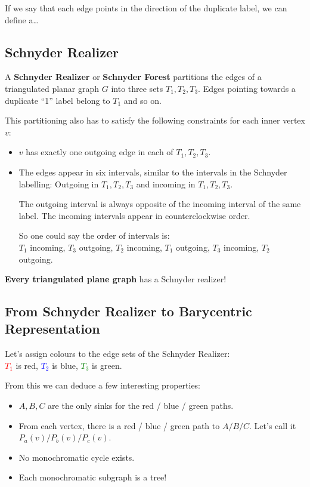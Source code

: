 \documentclass[10pt,a4paper]{article}
\begin{document}
If we say that each edge points in the direction of the duplicate label, we
can define a\ldots

\subsection{Schnyder Realizer}

A \textbf{Schnyder Realizer} or \textbf{Schnyder Forest} partitions the edges
of a triangulated planar graph $G$ into three sets $T_1, T_2, T_3$.
Edges pointing towards a duplicate \enquote{1} label belong to $T_1$ and so on.

This partitioning also has to satisfy the following constraints for each inner
vertex $v$:
\begin{itemize}
    \item $v$ has exactly one outgoing edge in each of $T_1, T_2, T_3$.
    \item The edges appear in six intervals, similar to the intervals in the
        Schnyder labelling: Outgoing in $T_1, T_2, T_3$ and incoming in $T_1,
        T_2, T_3$.

        The outgoing interval is always opposite of the incoming interval of
        the same label.
        The incoming intervals appear in counterclockwise order.

        So one could say the order of intervals is:\\
        $T_1$ incoming, $T_3$ outgoing, $T_2$ incoming, $T_1$ outgoing, $T_3$
        incoming, $T_2$ outgoing.
\end{itemize}

\textbf{Every triangulated plane graph} has a Schnyder realizer!

\subsection{From Schnyder Realizer to Barycentric Representation}

Let's assign colours to the edge sets of the Schnyder Realizer:\\
\textcolor{red}{$T_1$} is red, \textcolor{blue}{$T_2$} is blue,
\textcolor{green}{$T_3$} is green.

From this we can deduce a few interesting properties:
\begin{itemize}
    \item $A, B, C$ are the only sinks for the red / blue / green paths.
    \item From each vertex, there is a red / blue / green path to $A / B / C$.
        Let's call it $P_a(v) / P_b(v) / P_c(v)$.
    \item No monochromatic cycle exists.
    \item Each monochromatic subgraph is a tree!
\end{itemize}
\end{document}
